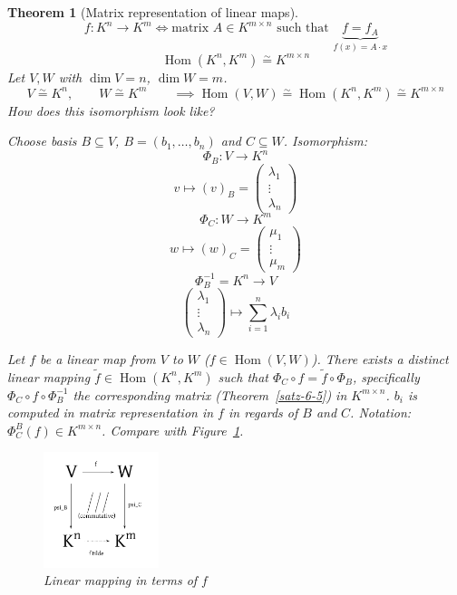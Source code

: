 \documentclass[a4paper,landscape,twocolumn]{article}
\newtheorem{theorem}{Theorem}[section]
\DeclareMathOperator\Hom{Hom} %
\begin{document}
\begin{theorem}[Matrix representation of linear maps]
  \label{satz-6.51}
  \[ f: K^n \to K^m \iff \text{matrix } A \in K^{m\times n} \text{ such that } \underbrace{f = f_A}_{f(x) = A \cdot x} \]
  \[ \Hom(K^n,K^m) \overset{\sim}{=} K^{m\times n} \]
  Let $V,W$ with $\dim{V} = n$, $\dim{W} = m$.
  \[
    V \overset{\sim}{=} K^n, \qquad
    W \overset{\sim}{=} K^m \qquad
    \implies \Hom(V, W) \overset{\sim}{=} \Hom(K^n,K^m) \overset{\sim}{=} K^{m\times n}
  \]
  How does this isomorphism look like?

  Choose basis $B \subseteq V$, $B = (b_1, \ldots, b_n)$ and $C \subseteq W$.
  Isomorphism:
  \[
    \Phi_B: V \to K^n
  \] \[
    v \mapsto (v)_B = \begin{pmatrix} \lambda_1 \\ \vdots \\ \lambda_n \end{pmatrix}
  \] \[
    \Phi_C: W \to K^m
  \] \[
    w \mapsto (w)_C = \begin{pmatrix} \mu_1 \\ \vdots \\ \mu_m \end{pmatrix}
  \] \[
    \Phi_B^{-1} = K^n \to V
  \] \[
    \begin{pmatrix} \lambda_1 \\ \vdots \\ \lambda_n \end{pmatrix}
      \mapsto
      \sum_{i=1}^n \lambda_i b_i
  \]

  Let $f$ be a linear map from $V$ to $W$ ($f \in \Hom(V, W)$).
  There exists a distinct linear mapping $\tilde{f} \in \Hom(K^n,K^m)$
  such that $\Phi_C \circ f = \tilde{f} \circ \Phi_B$, specifically
  $\Phi_C \circ f \circ \Phi_B^{-1}$ the corresponding matrix (Theorem~\ref{satz-6-5})
  in $K^{m\times n}$.
  $b_i$ is computed in matrix representation in $f$ in regards of $B$ and $C$.
  Notation: $\Phi_C^B(f) \in K^{m\times n}$.
  Compare with Figure~\ref{img:lm}.
  \begin{figure}[t]
    \begin{center}
      \includegraphics[width=0.3\textwidth]{img/linear_mapping.pdf}
      \caption{Linear mapping in terms of $f$}
      \label{img:lm}
    \end{center}
  \end{figure}
\end{theorem}
\end{document}
